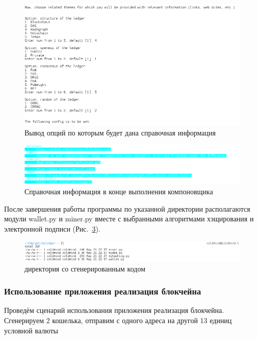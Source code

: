 \begin{figure}[h!]
    \centering
    \includegraphics[width=\textwidth]{./screenshots/additional_opts}
    \caption{Вывод опций по которым будет дана справочная информация}\label{additional_opts}
\end{figure}
\begin{figure}[h!]
    \centering
    \includegraphics[width=\textwidth]{./screenshots/spravka}
    \caption{Справочная информация в конце выполнения компоновщика}\label{spravka}
\end{figure}

После завершения работы программы по указанной директории располагаются
модули {\small wallet.py} и {\small miner.py} вместе с выбранными алгоритмами
хэщирования и электронной подписи (Рис.~\ref{lldir}).

\begin{figure}[h!]
    \centering
    \includegraphics[width=\textwidth]{./screenshots/lldir}
    \caption{директория со сгенерированным кодом}\label{lldir}
\end{figure}

\subsubsection{Использование приложения реализация блокчейна}
Проведём сценарий использования приложения реализация блокчейна. Сгенерируем 2
кошелька, отправим с одного адреса на другой 13 единиц условной валюты

